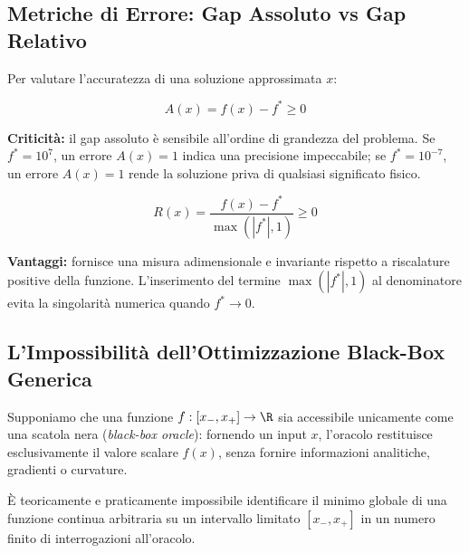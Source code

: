 \subsection{Metriche di Errore: Gap Assoluto vs Gap Relativo}
Per valutare l'accuratezza di una soluzione approssimata $x$:
\begin{definition}
\begin{equation}
A(x) = f(x) - f^* \ge 0
\end{equation}
\end{definition}
\textbf{Criticit\`a:} il gap assoluto \`e sensibile all'ordine di grandezza del problema. Se $f^* = 10^7$, un errore $A(x) = 1$ indica una precisione impeccabile; se $f^* = 10^{-7}$, un errore $A(x) = 1$ rende la soluzione priva di qualsiasi significato fisico.

\begin{definition}
\begin{equation}
R(x) = \frac{f(x) - f^*}{\max(|f^*|, 1)} \ge 0
\end{equation}
\end{definition}
\textbf{Vantaggi:} fornisce una misura adimensionale e invariante rispetto a riscalature positive della funzione. L'inserimento del termine $\max(|f^*|, 1)$ al denominatore evita la singolarit\`a numerica quando $f^* \to 0$.

\subsection{L'Impossibilit\`a dell'Ottimizzazione Black-Box Generica}
Supponiamo che una funzione $f: [x_-, x_+] \to \R$ sia accessibile unicamente come una scatola nera (\textit{black-box oracle}): fornendo un input $x$, l'oracolo restituisce esclusivamente il valore scalare $f(x)$, senza fornire informazioni analitiche, gradienti o curvature.

\begin{theorem}
\`E teoricamente e praticamente impossibile identificare il minimo globale di una funzione continua arbitraria su un intervallo limitato $[x_-, x_+]$ in un numero finito di interrogazioni all'oracolo.
\end{theorem}

